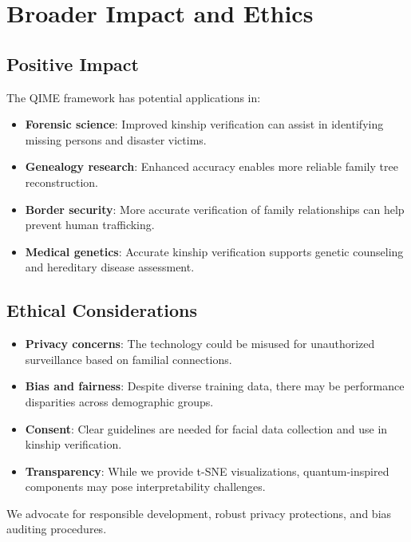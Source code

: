 \documentclass[journal,12pt]{IEEEtran}
\begin{document}
\section{Broader Impact and Ethics}
\label{sec:broader_impact}

\subsection{Positive Impact}
The QIME framework has potential applications in:
\begin{itemize}
    \item \textbf{Forensic science}: Improved kinship verification can
          assist in identifying missing persons and disaster victims.
    \item \textbf{Genealogy research}: Enhanced accuracy enables more
          reliable family tree reconstruction.
    \item \textbf{Border security}: More accurate verification of family
          relationships can help prevent human trafficking.
    \item \textbf{Medical genetics}: Accurate kinship verification
          supports genetic counseling and hereditary disease assessment.
\end{itemize}

\subsection{Ethical Considerations}
\begin{itemize}
    \item \textbf{Privacy concerns}: The technology could be misused for
          unauthorized surveillance based on familial connections.
    \item \textbf{Bias and fairness}: Despite diverse training data, there
          may be performance disparities across demographic groups.
    \item \textbf{Consent}: Clear guidelines are needed for facial data
          collection and use in kinship verification.
    \item \textbf{Transparency}: While we provide t-SNE visualizations,
          quantum-inspired components may pose interpretability challenges.
\end{itemize}

We advocate for responsible development, robust privacy protections, and
bias auditing procedures.
\end{document}
